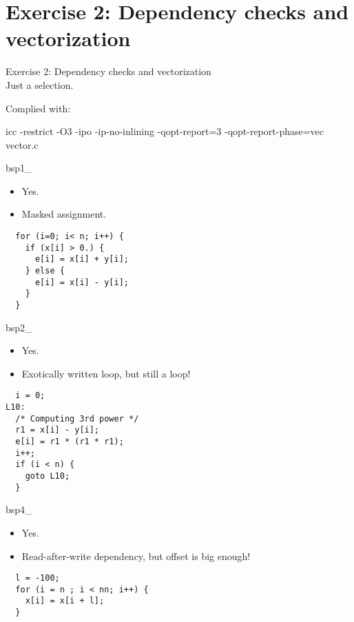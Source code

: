 \section{Exercise 2: Dependency checks and vectorization}

\begin{frame}{}
\begin{center}
{\Huge Exercise 2: Dependency checks and vectorization}\\\vspace{20pt}
{\Large Just a selection.}
\end{center}
\end{frame}

\begin{frame}{}
Complied with:
\begin{center}
icc -restrict -O3 -ipo -ip-no-inlining -qopt-report=3 -qopt-report-phase=vec vector.c
\end{center}
\end{frame}

\begin{frame}[fragile]{bsp1\_}
\begin{itemize}
\item Yes.
\item Masked assignment.
\end{itemize}
\begin{verbatim}
  for (i=0; i< n; i++) {
    if (x[i] > 0.) {
      e[i] = x[i] + y[i];
    } else {
      e[i] = x[i] - y[i];
    }
  }
\end{verbatim}
\end{frame}

\begin{frame}[fragile]{bsp2\_}
\begin{itemize}
\item Yes.
\item Exotically written loop, but still a loop!
\end{itemize}
\begin{verbatim}
  i = 0;
L10:
  /* Computing 3rd power */
  r1 = x[i] - y[i];
  e[i] = r1 * (r1 * r1);
  i++;
  if (i < n) {
    goto L10;
  }
\end{verbatim}
\end{frame}

\begin{frame}[fragile]{bsp4\_}
\begin{itemize}
\item Yes.
\item Read-after-write dependency, but offset is big enough!
\end{itemize}
\begin{verbatim}
  l = -100;
  for (i = n ; i < nn; i++) {
    x[i] = x[i + l];
  }
\end{verbatim}
\end{frame}

